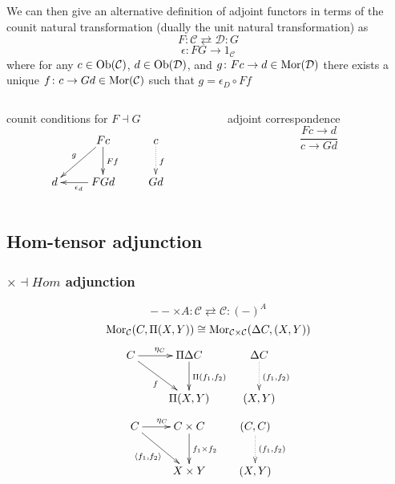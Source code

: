 \begin{frame}
We can then give an alternative definition of adjoint functors in terms of the counit natural transformation (dually the unit natural transformation) as
$$
F \colon \mathcal{C} \rightleftarrows \mathcal{D} \colon G
$$
$$
\epsilon \colon FG \rightarrow 1_{\mathcal{C}}
$$
where for any $c \in \mathop{\rm Ob}\nolimits (\mathcal{C})$, $d \in \mathop{\rm Ob}\nolimits (\mathcal{D})$, and $g \colon Fc \rightarrow d \in \mathop{\rm Mor}\nolimits(\mathcal{D})$ there exists a unique $f \colon c \rightarrow Gd \in \mathop{\rm Mor}\nolimits(\mathcal{C})$ such that $g = \epsilon_D \circ Ff$	
\begin{columns}[t]
    \begin{column}{0.5\textwidth}
\begin{block}{counit conditions for $F \dashv G$}
$$
			\xymatrix{
			& F c \ar[d]^{F f} \ar[dl]_{g} & c \ar@{.>}[d]^{f}\\
			d & F G d \ar[l]^{\epsilon_d} & G d}
$$
\end{block}
    \end{column}
    \begin{column}{0.5\textwidth}
		     \begin{block}{adjoint correspondence}
		\abovedisplayskip=0pt
		$$
			\frac{Fc \rightarrow d}{c \rightarrow Gd}
		$$
		\end{block}
    \end{column}
\end{columns}
\end{frame}

\subsection{Hom-tensor adjunction}
\begin{frame}
\frametitle{$\times \dashv Hom$ adjunction}
$$ -- \times A: \mathcal{C} \rightleftarrows \mathcal{C}: (-)^A$$
$$\mathop{\rm Mor}\nolimits_{\mathcal{C}}(C, \Pi (X,Y)) \cong  \mathop{\rm Mor}\nolimits_{\mathcal{C} \times \mathcal{C}}(\Delta C, (X,Y))$$
			$$
			\xymatrix{
			C \ar[r]^{\eta_C} \ar[dr]_{f} & \Pi \Delta C \ar[d]^{\Pi (f_1, f_2)} & \Delta C \ar@{.>}[d]^{(f_1,f_2)}\\
			& \Pi (X,Y) & (X,Y)}
			$$
			$$
			\xymatrix{
			C \ar[r]^{\eta_C} \ar[dr]_{\langle f_1, f_2 \rangle} & C \times C \ar[d]^{f_1 \times f_2} & (C,C) \ar@{.>}[d]^{(f_1,f_2)}\\
			& X \times Y & (X,Y)}
			$$
\end{frame}

